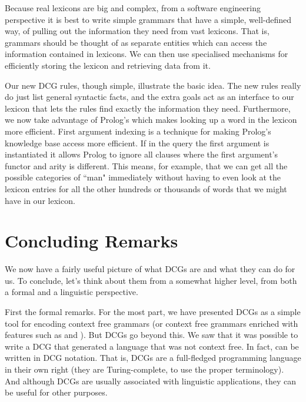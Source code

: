 Because real lexicons are big and complex, from a software engineering
perspective it is best to write simple grammars that have a simple,
well-defined way, of pulling out the information they need from vast
lexicons. That is, grammars should be thought of as separate entities
which can access the information contained in lexicons. We can then
use specialised mechanisms for efficiently storing the lexicon and
retrieving data from it.

Our new DCG rules, though simple, illustrate the basic idea. The new
rules really do just list general syntactic facts, and the extra goals
act as an interface to our lexicon that lets the rules find exactly
the information they need. Furthermore, we now take advantage of
Prolog's
 which makes looking up a word in the
lexicon more efficient. First argument indexing is a technique for
making Prolog's knowledge base access more efficient. If in the query
the first argument is instantiated it allows Prolog to ignore all
clauses where the first argument's functor and arity is
different. This means, for example, that we can get all the possible
categories of ``man" immediately without having to even look at the
lexicon entries for all the other hundreds or thousands of words that
we might have in our lexicon.

\section{Concluding Remarks}\label{SEC.L8.CONCLUDING.REMARKS}



We now have a fairly useful picture of what DCGs are and what they can
do for us.  To conclude, let's think about them from a somewhat higher
level, from both a formal and a linguistic perspective.

First the formal remarks.  For the most part, we have presented DCGs
as a simple tool for encoding context free grammars (or context free
grammars enriched with features such as  and
).  But DCGs go beyond this.  We saw that it was
possible to write a DCG that generated a language that was not context
free.  In fact,  can be written in DCG
notation.  That is, DCGs are a full-fledged programming language in
their own right (they are Turing-complete, to use the proper
terminology).  And although DCGs are usually associated with
linguistic applications, they can be useful for other purposes.

